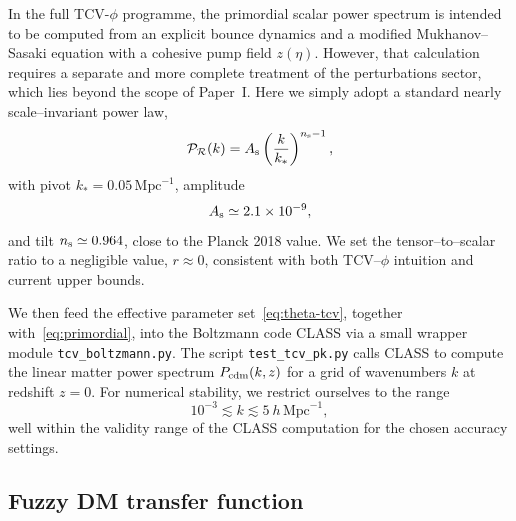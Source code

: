 \documentclass[aps,prd,onecolumn,nofootinbib,superscriptaddress]{revtex4-2}
\newcommand{\As}{A_{\rm s}}
\newcommand{\ns}{n_{\rm s}}
\begin{document}
In the full TCV-$\phi$ programme, the primordial scalar power spectrum is intended to be computed from an explicit bounce dynamics and a modified Mukhanov--Sasaki equation with a cohesive pump field $z(\eta)$.
However, that calculation requires a separate and more complete treatment of the perturbations sector, which lies beyond the scope of Paper~I.
Here we simply adopt a standard nearly scale--invariant power law,
\begin{equation}
  \mathcal{P}_{\mathcal{R}}(k)
  = \As \left(\frac{k}{k_*}\right)^{\ns-1},
  \label{eq:primordial}
\end{equation}
with pivot $k_* = 0.05\,\mathrm{Mpc}^{-1}$, amplitude
\begin{equation}
  \As \simeq 2.1\times 10^{-9},
\end{equation}
and tilt $\ns\simeq 0.964$, close to the Planck 2018 value.
We set the tensor--to--scalar ratio to a negligible value, $r\approx 0$, consistent with both TCV--$\phi$ intuition and current upper bounds.

We then feed the effective parameter set~\eqref{eq:theta-tcv}, together with~\eqref{eq:primordial}, into the Boltzmann code CLASS via a small wrapper module \texttt{tcv\_boltzmann.py}.
The script \texttt{test\_tcv\_pk.py} calls CLASS to compute the linear matter power spectrum $P_{\rm cdm}(k,z)$ for a grid of wavenumbers $k$ at redshift $z=0$.
For numerical stability, we restrict ourselves to the range
\begin{equation}
  10^{-3} \lesssim k \lesssim 5~h\,\mathrm{Mpc}^{-1},
\end{equation}
well within the validity range of the CLASS computation for the chosen accuracy settings.

\subsection{Fuzzy DM transfer function}
\end{document}
